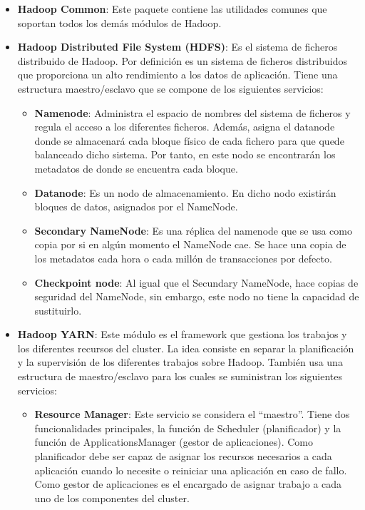 \begin{itemize}
	\item \textbf{Hadoop Common}: Este paquete contiene las utilidades comunes que soportan todos los demás módulos de Hadoop.
	\item \textbf{Hadoop Distributed File System (HDFS)}: Es el sistema de ficheros distribuido de Hadoop. Por definición es un sistema de ficheros distribuidos que proporciona un alto rendimiento a los datos de aplicación. Tiene una estructura maestro/esclavo que se compone de los siguientes servicios:
	\begin{itemize}
		\item \textbf{Namenode}: Administra el espacio de nombres del sistema de ficheros y regula el acceso a los diferentes ficheros. Además, asigna el datanode donde se almacenará cada bloque físico de cada fichero para que quede balanceado dicho sistema. Por tanto, en este nodo se encontrarán los metadatos de donde se encuentra cada bloque.
		\item \textbf{Datanode}: Es un nodo de almacenamiento. En dicho nodo existirán bloques de datos, asignados por el NameNode.
		\item \textbf{Secondary NameNode}: Es una réplica del namenode que se usa como copia por si en algún momento el NameNode cae. Se hace una copia de los metadatos cada hora o cada millón de transacciones por defecto.
		\item \textbf{Checkpoint node}: Al igual que el Secundary NameNode, hace copias de seguridad del NameNode, sin embargo, este nodo no tiene la capacidad de sustituirlo.
	\end{itemize}
	\item \textbf{Hadoop YARN}: Este módulo es el framework que gestiona los trabajos y los diferentes recursos del cluster. La idea consiste en separar la planificación y la supervisión de los diferentes trabajos sobre Hadoop. También usa una estructura de maestro/esclavo para los cuales se suministran los siguientes servicios:
	\begin{itemize}
		\item \textbf{Resource Manager}: Este servicio se considera el “maestro”. Tiene dos funcionalidades principales, la función de Scheduler (planificador) y la función de ApplicationsManager (gestor de aplicaciones). Como planificador debe ser capaz de asignar los recursos necesarios a cada aplicación cuando lo necesite o reiniciar una aplicación en caso de fallo. Como gestor de aplicaciones es el encargado de asignar trabajo a cada uno de los componentes del cluster.

\end{itemize}
\end{itemize}
